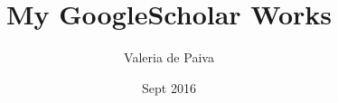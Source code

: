 \documentclass[11pt]{article}
\title{My GoogleScholar Works}
\author{Valeria de Paiva}
\date{Sept 2016}                                           %
\begin{document}
\maketitle


\nocite{*}

 
%

\end{document}
